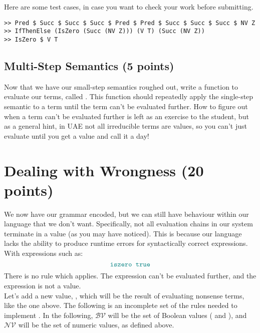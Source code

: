 \documentclass{exam}
\let\OldTexttt\texttt
\renewcommand{\texttt}[1]{\OldTexttt{\color{teal}{#1}}}
\begin{document}
Here are some test cases, in case you want to check your work before submitting.
\begin{lstlisting}[style=C]
>> Pred $ Succ $ Succ $ Succ $ Pred $ Pred $ Succ $ Succ $ Succ $ NV Z
>> IfThenElse (IsZero (Succ (NV Z))) (V T) (Succ (NV Z))
>> IsZero $ V T
\end{lstlisting}


\subsection{Multi-Step Semantics (5 points)}

Now that we have our small-step semantics roughed out, write a function to evaluate our terms, called \texttt{eval}.  This function should repeatedly apply the single-step semantic to a term until the term can't be evaluated further.  How to figure out when a term can't be evaluated further is left as an exercise to the student, but as a general hint, in UAE not all irreducible terms are values, so you can't just evaluate until you get a value and call it a day! \\

\section{Dealing with Wrongness (20 points)}
We now have our grammar encoded, but we can still have behaviour within our language that we don't want.  Specifically, not all evaluation chains in our system terminate in a value (as you may have noticed).  This is because our language lacks the ability to produce runtime errors for syntactically correct expressions. With expressions such as:
\begin{equation}
\texttt{iszero true}
\end{equation}
There is no rule which applies.  The expression can't be evaluated further, and the expression is not a value.  \\

Let's add a new value, \texttt{wrong}, which will be the result of evaluating nonsense terms, like the one above.  The following is an incomplete set of the rules needed to implement \texttt{wrong}.  In the following, $\mathcal{BV}$ will be the set of Boolean values (\texttt{true} and \texttt{false}), and $\mathcal{NV}$ will be the set of numeric values, as defined above.
\end{document}
